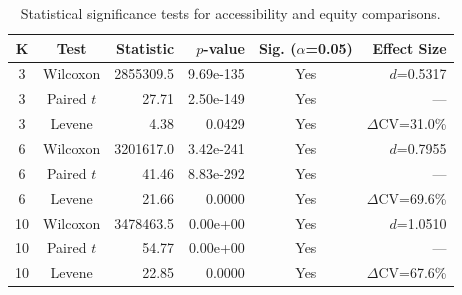 \begin{table}[htbp]
\centering
\caption{Statistical significance tests for accessibility and equity comparisons.}
\label{tab:statistical_tests}
\begin{tabular}{ccrrcr}
\toprule
K & Test & Statistic & $p$-value & Sig. ($\alpha$=0.05) & Effect Size \\
\midrule
3 & Wilcoxon & 2855309.5 & 9.69e-135 & Yes & $d$=0.5317 \\
3 & Paired $t$ & 27.71 & 2.50e-149 & Yes & --- \\
3 & Levene & 4.38 & 0.0429 & Yes & $\Delta$CV=31.0\% \\
\midrule
6 & Wilcoxon & 3201617.0 & 3.42e-241 & Yes & $d$=0.7955 \\
6 & Paired $t$ & 41.46 & 8.83e-292 & Yes & --- \\
6 & Levene & 21.66 & 0.0000 & Yes & $\Delta$CV=69.6\% \\
\midrule
10 & Wilcoxon & 3478463.5 & 0.00e+00 & Yes & $d$=1.0510 \\
10 & Paired $t$ & 54.77 & 0.00e+00 & Yes & --- \\
10 & Levene & 22.85 & 0.0000 & Yes & $\Delta$CV=67.6\% \\
\midrule
\bottomrule
\end{tabular}
\end{table}